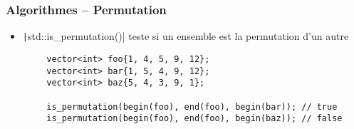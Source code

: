 \documentclass[C++.tex]{subfiles}
\begin{document}
\begin{frame}[fragile]
	\frametitle{Algorithmes -- Permutation}
	\begin{itemize}
		\item \texttt|std::is_permutation()| teste si un ensemble est la permutation d'un autre
	\end{itemize}

	\begin{verbatim}
		vector<int> foo{1, 4, 5, 9, 12};
		vector<int> bar{1, 5, 4, 9, 12};
		vector<int> baz{5, 4, 3, 9, 1};

		is_permutation(begin(foo), end(foo), begin(bar)); // true
		is_permutation(begin(foo), end(foo), begin(baz)); // false
	\end{verbatim}

\end{frame}
\end{document}
